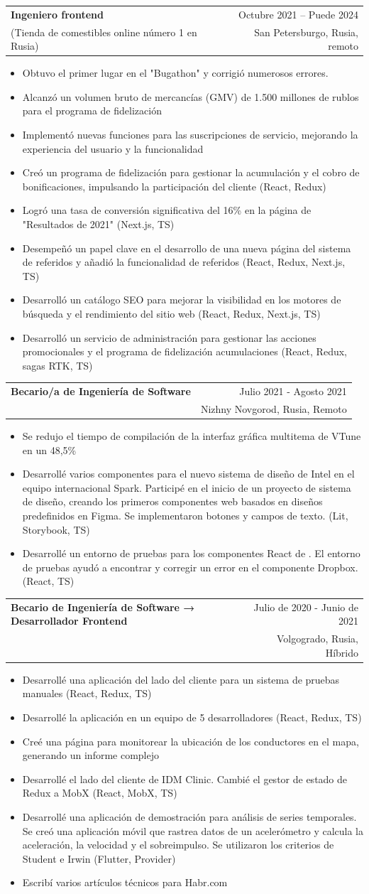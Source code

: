 \documentclass[A4,11pt]{article}
\makeatletter
\newcommand{\CVItem}[1]{
  \item\small{
    {#1 \vspace{-2pt}}
  }
}
\newcommand{\CVSubheading}[4]{
  \vspace{-2pt}\item
    \begin{tabular*}{0.97\textwidth}[t]{l@{\extracolsep{\fill}}r}
      \textbf{#1} & #2 \\
      \small#3 & \small #4 \\
    \end{tabular*}\vspace{-7pt}
}
\newcommand{\lowDescendersUnderline}[1]{%
  \uline{\phantom{#1}}%
  \llap{\contour{white}{#1}}%
}
\newcommand{\link}[2]{
  \href{#1}{\lowDescendersUnderline{#2}}
}
\newcommand{\CVItemListStart}{\begin{itemize}}
\newcommand{\CVItemListEnd}{\end{itemize}\vspace{-5pt}}
\makeatother
\begin{document}
\CVSubheading
{Ingeniero frontend}{Octubre 2021 -- Puede 2024}
{\link{https://sbermarket.ru/}{SberMarket} (Tienda de comestibles online número 1 en Rusia)}{San Petersburgo, Rusia, remoto}
\CVItemListStart
\CVItem{Obtuvo el primer lugar en el "Bugathon" y corrigió numerosos errores.}
\CVItem{Alcanzó un volumen bruto de mercancías (GMV) de 1.500 millones de rublos para el programa de fidelización}
\CVItem{Implementó nuevas funciones para las suscripciones de servicio, mejorando la experiencia del usuario y la funcionalidad}
\CVItem{Creó un programa de fidelización para gestionar la acumulación y el cobro de bonificaciones, impulsando la participación del cliente (React, Redux)}
\CVItem{Logró una tasa de conversión significativa del 16\% en la página de "Resultados de 2021" (Next.js, TS)}
\CVItem{Desempeñó un papel clave en el desarrollo de una nueva página del sistema de referidos y añadió la funcionalidad de referidos (React, Redux, Next.js, TS)}
\CVItem{Desarrolló un catálogo SEO para mejorar la visibilidad en los motores de búsqueda y el rendimiento del sitio web (React, Redux, Next.js, TS)}
\CVItem{Desarrolló un servicio de administración para gestionar las acciones promocionales y el programa de fidelización acumulaciones (React, Redux, sagas RTK, TS)}
\CVItemListEnd


\CVSubheading
{Becario/a de Ingeniería de Software}{Julio 2021 - Agosto 2021}
{\link{http://summer.russia-students.ru/}{Intel Corporation}}{Nizhny Novgorod, Rusia, Remoto}
\CVItemListStart
\CVItem{Se redujo el tiempo de compilación de la interfaz gráfica multitema de VTune en un 48,5\%}
\CVItem{Desarrollé varios componentes para el nuevo sistema de diseño de Intel en el equipo internacional Spark. Participé en el inicio de un proyecto de sistema de diseño, creando los primeros componentes web basados en diseños predefinidos en Figma. Se implementaron botones y campos de texto. (Lit, Storybook, TS)}
\CVItem{Desarrollé un entorno de pruebas para los componentes React de \link{https://www.intel.com/content/www/us/en/developer/tools/oneapi/vtune-profiler.html}{VTune}. El entorno de pruebas ayudó a encontrar y corregir un error en el componente Dropbox. (React, TS)}
\CVItemListEnd

\CVSubheading
{Becario de Ingeniería de Software → Desarrollador Frontend}{Julio de 2020 - Junio de 2021}
{\link{https://www.singularis-lab.com/}{Singularis Lab LLC.}}{Volgogrado, Rusia, Híbrido}
\CVItemListStart
\CVItem{Desarrollé una aplicación del lado del cliente para un sistema de pruebas manuales (React, Redux, TS)}
\CVItem{Desarrollé la aplicación \link{https://www.singularis-lab.com/ru/project/volma-portal.html}{Volma Drivers} en un equipo de 5 desarrolladores (React, Redux, TS)}
\CVItem{Creé una página para monitorear la ubicación de los conductores en el mapa, generando un informe complejo}
\CVItem{Desarrollé el lado del cliente de IDM Clinic. Cambié el gestor de estado de Redux a MobX (React, MobX, TS)}
\CVItem{Desarrollé una aplicación de demostración para análisis de series temporales. Se creó una aplicación móvil que rastrea datos de un acelerómetro y calcula la aceleración, la velocidad y el sobreimpulso. Se utilizaron los criterios de Student e Irwin (Flutter, Provider)}
\CVItem{Escribí varios artículos técnicos para Habr.com}
\CVItemListEnd
\end{document}
